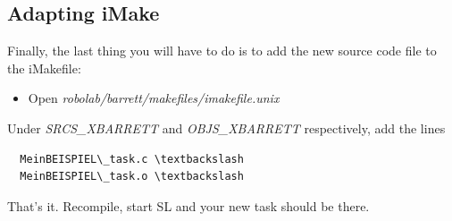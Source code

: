 \documentclass[11pt, article, colorback]{article}
\begin{document}
\subsection{Adapting iMake}
Finally, the last thing you will have to do is to add the new source code file to the iMakefile:
\begin{itemize}
  \item Open {\em robolab/barrett/makefiles/imakefile.unix}
\end{itemize}
%
Under {\em SRCS\_XBARRETT} and {\em OBJS\_XBARRETT} respectively, add the lines
\begin{lstlisting}
  MeinBEISPIEL\_task.c \textbackslash
  MeinBEISPIEL\_task.o \textbackslash
\end{lstlisting}
%
That's it. Recompile, start SL and your new task should be there.
\end{document}
